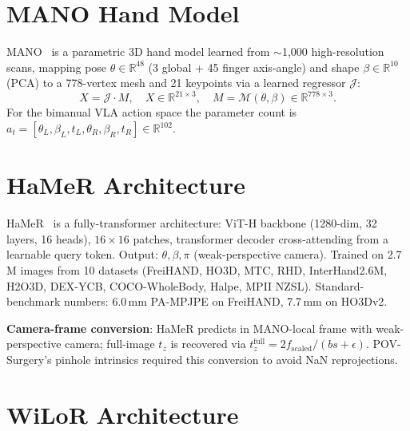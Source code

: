 \documentclass{article}
\begin{document}



\appendix

\section{MANO Hand Model}
\label{app:mano}

MANO~\cite{romero2017mano} is a parametric 3D hand model learned from $\sim$1{,}000 high-resolution scans, mapping pose $\theta \in \mathbb{R}^{48}$ (3 global + 45 finger axis-angle) and shape $\beta \in \mathbb{R}^{10}$ (PCA) to a 778-vertex mesh and 21 keypoints via a learned regressor $\mathcal{J}$:
\begin{equation}
X = \mathcal{J} \cdot M, \quad X \in \mathbb{R}^{21 \times 3}, \quad M = \mathcal{M}(\theta, \beta) \in \mathbb{R}^{778 \times 3}.
\end{equation}
For the bimanual VLA action space the parameter count is $a_t = [\theta_L, \beta_L, t_L, \theta_R, \beta_R, t_R] \in \mathbb{R}^{102}$.

\section{HaMeR Architecture}
\label{app:hamer}

HaMeR~\cite{pavlakos2024hamer} is a fully-transformer architecture: ViT-H backbone (1280-dim, 32 layers, 16 heads), $16{\times}16$ patches, transformer decoder cross-attending from a learnable query token. Output: $\theta, \beta, \pi$ (weak-perspective camera). Trained on 2.7\,M images from 10 datasets (FreiHAND, HO3D, MTC, RHD, InterHand2.6M, H2O3D, DEX-YCB, COCO-WholeBody, Halpe, MPII NZSL). Standard-benchmark numbers: 6.0\,mm PA-MPJPE on FreiHAND, 7.7\,mm on HO3Dv2.

\textbf{Camera-frame conversion}: HaMeR predicts in MANO-local frame with weak-perspective camera; full-image $t_z$ is recovered via $t_z^{\text{full}} = 2 f_{\text{scaled}} / (b s + \epsilon)$. POV-Surgery's pinhole intrinsics required this conversion to avoid NaN reprojections.

\section{WiLoR Architecture}
\label{app:wilor}
\end{document}
